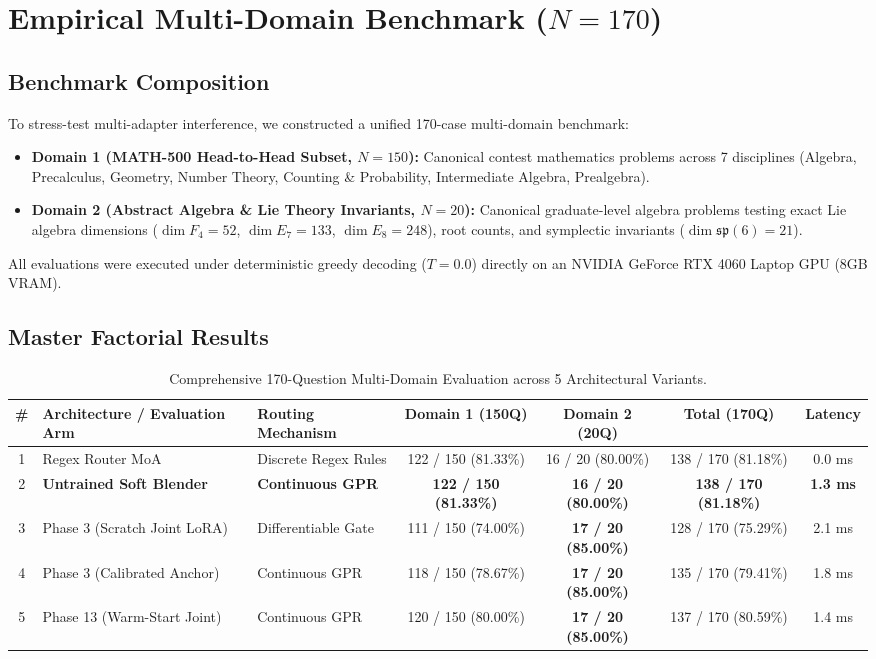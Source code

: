 \documentclass[11pt,a4paper]{article}
\begin{document}
\section{Empirical Multi-Domain Benchmark ($N=170$)}

\subsection{Benchmark Composition}

To stress-test multi-adapter interference, we constructed a unified 170-case multi-domain benchmark:
\begin{itemize}
    \item \textbf{Domain 1 (MATH-500 Head-to-Head Subset, $N=150$):} Canonical contest mathematics problems across 7 disciplines (Algebra, Precalculus, Geometry, Number Theory, Counting \& Probability, Intermediate Algebra, Prealgebra).
    \item \textbf{Domain 2 (Abstract Algebra \& Lie Theory Invariants, $N=20$):} Canonical graduate-level algebra problems testing exact Lie algebra dimensions ($\dim F_4 = 52$, $\dim E_7 = 133$, $\dim E_8 = 248$), root counts, and symplectic invariants ($\dim \mathfrak{sp}(6) = 21$).
\end{itemize}
All evaluations were executed under deterministic greedy decoding ($T=0.0$) directly on an NVIDIA GeForce RTX 4060 Laptop GPU (8GB VRAM).

\subsection{Master Factorial Results}

\begin{table}[htbp]
\centering
\caption{Comprehensive 170-Question Multi-Domain Evaluation across 5 Architectural Variants.}
\label{tab:soft_moa}
\small
\begin{tabular}{@{}cllcccc@{}}
\toprule
\textbf{\#} & \textbf{Architecture / Evaluation Arm} & \textbf{Routing Mechanism} & \textbf{Domain 1 (150Q)} & \textbf{Domain 2 (20Q)} & \textbf{Total (170Q)} & \textbf{Latency} \\
\midrule
1 & Regex Router MoA & Discrete Regex Rules & 122 / 150 (81.33\%) & 16 / 20 (80.00\%) & 138 / 170 (81.18\%) & 0.0 ms \\
2 & \textbf{Untrained Soft Blender} & \textbf{Continuous GPR} & \textbf{122 / 150 (81.33\%)} & \textbf{16 / 20 (80.00\%)} & \textbf{138 / 170 (81.18\%)} & \textbf{1.3 ms} \\
3 & Phase 3 (Scratch Joint LoRA) & Differentiable Gate & 111 / 150 (74.00\%) & \textbf{17 / 20 (85.00\%)} & 128 / 170 (75.29\%) & 2.1 ms \\
4 & Phase 3 (Calibrated Anchor) & Continuous GPR & 118 / 150 (78.67\%) & \textbf{17 / 20 (85.00\%)} & 135 / 170 (79.41\%) & 1.8 ms \\
5 & Phase 13 (Warm-Start Joint) & Continuous GPR & 120 / 150 (80.00\%) & \textbf{17 / 20 (85.00\%)} & 137 / 170 (80.59\%) & 1.4 ms \\
\bottomrule
\end{tabular}
\end{table}
\end{document}
